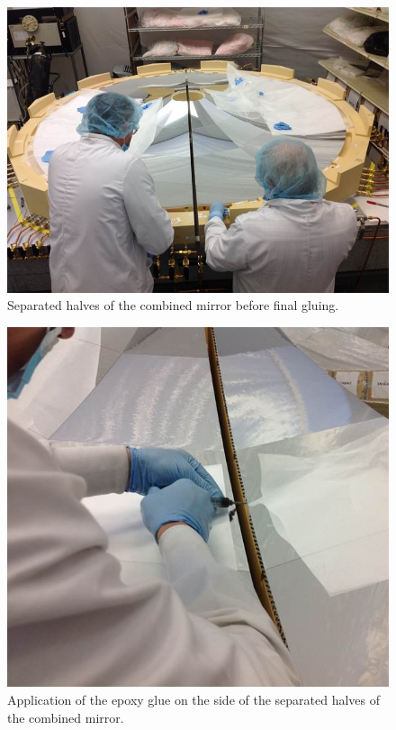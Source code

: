   \begin{figure}[ht]
    \centering
    \includegraphics[width=1.0\linewidth]{images/Separated_halves.jpg}
    \caption{Separated halves of the combined mirror before final gluing.}
    \label{fig:Separated_halves}
\end{figure}
         
 \begin{figure}[ht]
    \centering
    \includegraphics[width=1.0\linewidth]{images/Final_Gluing.jpg}
    \caption{Application of the epoxy glue on the side of the separated halves of the combined mirror.}
    \label{fig:Final_Gluing}
\end{figure}
  
